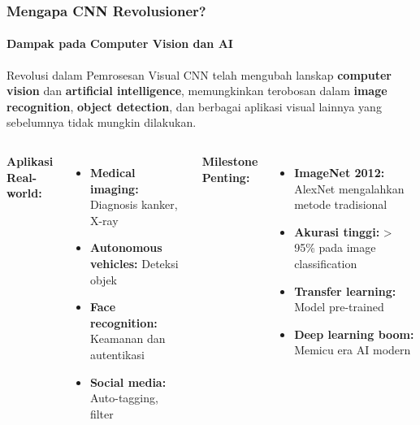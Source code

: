 \documentclass[t,aspectratio=169,xcolor=dvipsnames]{beamer}
\begin{document}
\begin{frame}
    \frametitle{Mengapa CNN Revolusioner?}
    \framesubtitle{Dampak pada Computer Vision dan AI}
    \small

    \begin{block}{Revolusi dalam Pemrosesan Visual}
        CNN telah mengubah lanskap \textbf{computer vision} dan \textbf{artificial intelligence}, memungkinkan terobosan dalam \textbf{image recognition}, \textbf{object detection}, dan berbagai aplikasi visual lainnya yang sebelumnya tidak mungkin dilakukan.
    \end{block}

    \begin{columns}[t]
        \textbf{Aplikasi Real-world:}
        \begin{itemize}
            \item \textbf{Medical imaging:} Diagnosis kanker, X-ray
            \item \textbf{Autonomous vehicles:} Deteksi objek
            \item \textbf{Face recognition:} Keamanan dan autentikasi
            \item \textbf{Social media:} Auto-tagging, filter
        \end{itemize}

        \textbf{Milestone Penting:}
        \begin{itemize}
            \item \textbf{ImageNet 2012:} AlexNet mengalahkan metode tradisional
            \item \textbf{Akurasi tinggi:} > 95\% pada image classification
            \item \textbf{Transfer learning:} Model pre-trained
            \item \textbf{Deep learning boom:} Memicu era AI modern
        \end{itemize}
    \end{columns}
\end{frame}
\end{document}
